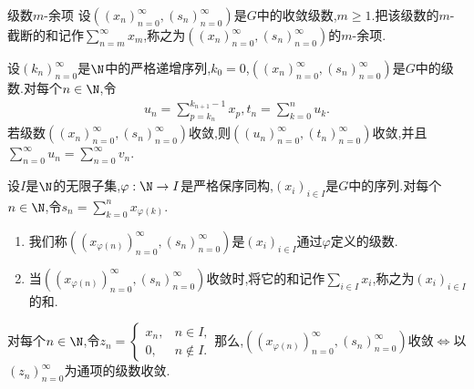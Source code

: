 \begin{definition}{级数$m$-余项}{}
	设$\left(\left(x_{n}\right)_{n=0}^{\infty},\left(s_{n}\right)_{n=0}^{\infty}\right)$是$G$中的收敛级数,$m\geq 1$.把该级数的$m$-截断的和记作$\sum\limits_{n=m}^{\infty}x_{m}$,称之为$\left(\left(x_{n}\right)_{n=0}^{\infty},\left(s_{n}\right)_{n=0}^{\infty}\right)$的$m$-余项.
\end{definition}

\begin{proposition}{}{}
	设$\left(k_{n}\right)_{n=0}^{\infty}$是$\N$中的严格递增序列,$k_{0}=0$,$\left(\left(x_{n}\right)_{n=0}^{\infty},\left(s_{n}\right)_{n=0}^{\infty}\right)$是$G$中的级数.对每个$n\in\N$,令
	\begin{align*}
		u_{n}=\sum\limits_{p=k_{n}}^{k_{n+1}-1}x_{p},t_{n}=\sum\limits_{k=0}^{n}u_{k}.
	\end{align*}
	若级数$\left(\left(x_{n}\right)_{n=0}^{\infty},\left(s_{n}\right)_{n=0}^{\infty}\right)$收敛,则$\left(\left(u_{n}\right)_{n=0}^{\infty},\left(t_{n}\right)_{n=0}^{\infty}\right)$收敛,并且$\sum\limits_{n=0}^{\infty}u_{n}=\sum\limits_{n=0}^{\infty}v_{n}$.
\end{proposition}

\begin{definition}{}{}
	设$I$是$\N$的无限子集,$\varphi:\N\to I$是严格保序同构,$\left(x_{i}\right)_{i\in I}$是$G$中的序列.对每个$n\in\N$,令$s_{n}=\sum\limits_{k=0}^{n}x_{\varphi\left(k\right)}$.
	\begin{enumerate}
		\item 我们称$\left(\left(x_{\varphi\left(n\right)}\right)_{n=0}^{\infty},\left(s_{n}\right)_{n=0}^{\infty}\right)$是$\left(x_{i}\right)_{i\in I}$通过$\varphi$定义的级数.
		\item 当$\left(\left(x_{\varphi\left(n\right)}\right)_{n=0}^{\infty},\left(s_{n}\right)_{n=0}^{\infty}\right)$收敛时,将它的和记作$\sum\limits_{i\in I}x_{i}$,称之为$\left(x_{i}\right)_{i\in I}$的和.
	\end{enumerate}
\end{definition}

\begin{remark}{}{}
	对每个$n\in\N$,令$z_{n}=
	\begin{cases}
		x_{n},&n\in I,\\
		0,&n\notin I.
	\end{cases}$那么,$\left(\left(x_{\varphi\left(n\right)}\right)_{n=0}^{\infty},\left(s_{n}\right)_{n=0}^{\infty}\right)$收敛$\iff$以$\left(z_{n}\right)_{n=0}^{\infty}$为通项的级数收敛.
\end{remark}
